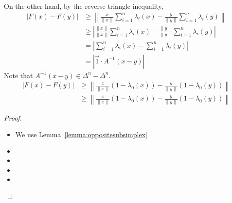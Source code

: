 \documentclass[a4paper]{article}
\begin{document}
On the other hand, by the reverse triangle inequality,
    \begin{align}
        \left| F(x) - F(y) \right|
        &\geq 
        \left\| 
            \frac{x}{\|x\|}
            \sum_{i=1}^{n} \lambda_{i}(x)
            -
            \frac{y}{\|y\|}
            \sum_{i=1}^{n} \lambda_{i}(y)
        \right\|
        \\&
        \geq 
        \left| 
            \frac{\|x\|}{\|x\|}
            \sum_{i=1}^{n} \lambda_{i}(x)
            -
            \frac{\|y\|}{\|y\|}
            \sum_{i=1}^{n} \lambda_{i}(y)
        \right|
        \\&
        = 
        \left| 
            \sum_{i=1}^{n} \lambda_{i}(x)
            -
            \sum_{i=1}^{n} \lambda_{i}(y)
        \right|
        \\&
        = 
        \left| 
            \vec{1}
            \cdot 
            A^{-1}( x - y )
        \right|
    \end{align}
    Note that $A^{-1}( x - y ) \in \Delta^{n} - \Delta^{n}$. 
    \begin{align}
        \left| F(x) - F(y) \right|
        &\geq 
        \left\| 
            \frac{x}{\|x\|}
            \left( 1 - \lambda_{0}(x) \right) 
            -
            \frac{y}{\|y\|}
            \left( 1 - \lambda_{0}(y) \right) 
        \right\|
        \\&
        \geq 
        \left\| 
            \frac{x}{\|x\|}
            \left( 1 - \lambda_{0}(x) \right) 
            -
            \frac{y}{\|y\|}
            \left( 1 - \lambda_{0}(y) \right) 
        \right\|
    \end{align}
    
    
    
    
    
    
    
    
    
    
    \begin{proof}
\begin{itemize}
    \item 
    We use Lemma~\ref{lemma:oppositesubsimplex}
    \item 
    \item 
    \item 
    \item 
\end{itemize}
\end{proof}
\end{document}
